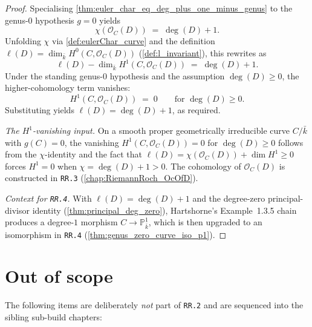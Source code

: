 \begin{proof}
  
  Specialising
  \cref{thm:euler_char_eq_deg_plus_one_minus_genus} to the genus-\(0\)
  hypothesis \(g = 0\) yields
  \[
    \chi(\mathcal O_C(D)) \;=\; \deg(D) + 1.
  \]
  Unfolding \(\chi\) via \cref{def:eulerChar_curve} and the definition
  \(\ell(D) = \dim_{\bar k} H^0(C, \mathcal O_C(D))\)
  (\cref{def:l_invariant}), this rewrites as
  \[
    \ell(D) - \dim_{\bar k} H^1(C, \mathcal O_C(D))
    \;=\; \deg(D) + 1.
  \]
  Under the standing genus-\(0\) hypothesis and the assumption
  \(\deg(D) \geq 0\), the higher-cohomology term vanishes:
  \[
    H^1(C, \mathcal O_C(D)) \;=\; 0
    \qquad \text{for } \deg(D) \geq 0.
  \]
  Substituting yields \(\ell(D) = \deg(D) + 1\), as required.

  \emph{The \(H^1\)-vanishing input.} On a smooth proper geometrically
  irreducible curve \(C / \bar k\) with \(g(C) = 0\), the vanishing
  \(H^1(C, \mathcal O_C(D)) = 0\) for \(\deg(D) \geq 0\) follows from
  the \(\chi\)-identity and the fact that \(\ell(D) = \chi(\mathcal O_C(D)) +
  \dim H^1 \geq 0\) forces \(H^1 = 0\) when \(\chi = \deg(D) + 1 > 0\).
  The cohomology of \(\mathcal O_C(D)\) is constructed in \texttt{RR.3}
  (\cref{chap:RiemannRoch_OcOfD}).

  \emph{Context for \texttt{RR.4}.} With \(\ell(D) = \deg(D) + 1\) and
  the degree-zero principal-divisor identity (\cref{thm:principal_deg_zero}),
  Hartshorne's Example~1.3.5 chain produces a degree-\(1\) morphism
  \(C \to \mathbb P^1_{\bar k}\), which is then upgraded to an isomorphism
  in \texttt{RR.4} (\cref{thm:genus_zero_curve_iso_p1}).
\end{proof}

\section{Out of scope}

The following items are deliberately \emph{not} part of \texttt{RR.2}
and are sequenced into the sibling sub-build chapters:

